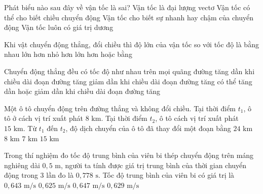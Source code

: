 \begin{ex} Phát biểu nào sau đây về vận tốc là sai?
\choice
{Vận tốc là đại lượng vectơ}
{Vận tốc có thể cho biết chiều chuyển động}
{Vận tốc cho biết sự nhanh hay chậm của chuyển động}
{\True Vận tốc luôn có giá trị dương}
\end{ex}

\begin{ex} Khi vật chuyển động thẳng, đổi chiều thì độ lớn của vận tốc so với tốc độ là
\choice
{bằng nhau}
{lớn hơn}
{\True nhỏ hơn}
{lớn hơn hoặc bằng}
\end{ex}

\begin{ex} Chuyển động thẳng đều có tốc độ
\choice
{\True như nhau trên mọi quãng đường}
{tăng dần khi chiều dài đoạn đường tăng}
{giảm dần khi chiều dài đoạn đường tăng}
{có thể tăng dần hoặc giảm dần khi chiều dài đoạn đường tăng}
\end{ex}

\begin{ex} Một ô tô chuyển động trên đường thẳng và không đổi chiều. Tại thời điểm $t_1$, ô tô ở cách vị trí xuất phát $8\text{ km}$. Tại thời điểm $t_2$, ô tô cách vị trí xuất phát $15\text{ km}$. Từ $t_1$ đến $t_2$, độ dịch chuyển của ô tô đã thay đổi một đoạn bằng
\choice
{$24\text{ km}$}
{$8\text{ km}$}
{\True $7\text{ km}$}
{$15\text{ km}$}
\end{ex}

\begin{ex} Trong thí nghiệm đo tốc độ trung bình của viên bi thép chuyển động trên máng nghiêng dài $0{,}5\text{ m}$, người ta tính được giá trị trung bình của thời gian chuyển động trong 3 lần đo là $0{,}778\text{ s}$. Tốc độ trung bình của viên bi có giá trị là
\choice
{\True $0{,}643\text{ m/s}$}
{$0{,}625\text{ m/s}$}
{$0{,}647\text{ m/s}$}
{$0{,}629\text{ m/s}$}
\end{ex}

